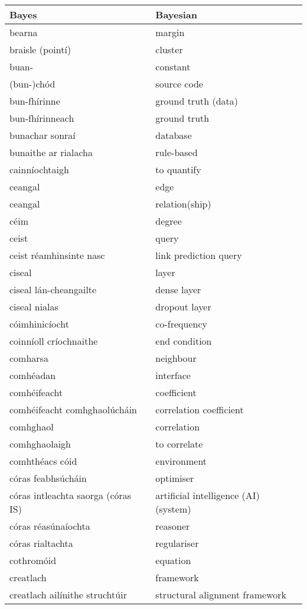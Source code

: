 \begin{longtable}{|l|l|}
		Bayes&Bayesian\\ \hline 
		bearna&margin\\ \hline 
		braisle (pointí)&cluster\\ \hline 
		buan-&constant\\ \hline 
		(bun-)chód&source code\\ \hline 
		bun-fhírinne&ground truth (data)\\ \hline 
		bun-fhírinneach&ground truth\\ \hline 
		bunachar sonraí&database\\ \hline 
		bunaithe ar rialacha&rule-based\\ \hline 
		cainníochtaigh&to quantify\\ \hline 
		ceangal&edge\\ \hline 
		ceangal&relation(ship)\\ \hline 
		céim&degree\\ \hline 
		ceist&query\\ \hline 
		ceist réamhinsinte nasc&link prediction query\\ \hline 
		ciseal&layer\\ \hline 
		ciseal lán-cheangailte&dense layer\\ \hline 
		ciseal nialas&dropout layer\\ \hline 
		cóimhinicíocht&co-frequency\\ \hline 
		coinníoll críochnaithe&end condition\\ \hline 
		comharsa&neighbour\\ \hline 
		comhéadan&interface\\ \hline 
		comhéifeacht&coefficient\\ \hline 
		comhéifeacht comhghaolúcháin&correlation coefficient\\ \hline 
		comhghaol&correlation\\ \hline 
		comhghaolaigh&to correlate\\ \hline 
		comhthéacs cóid&environment\\ \hline 
		córas feabhsúcháin&optimiser\\ \hline 
		córas intleachta saorga (córas IS)&artificial intelligence (AI) (system)\\ \hline 
		córas réasúnaíochta&reasoner\\ \hline 
		córas rialtachta&regulariser\\ \hline 
		cothromóid&equation\\ \hline 
		creatlach&framework\\ \hline 
		creatlach ailínithe struchtúir&structural alignment framework\\ \hline 

\end{longtable}
